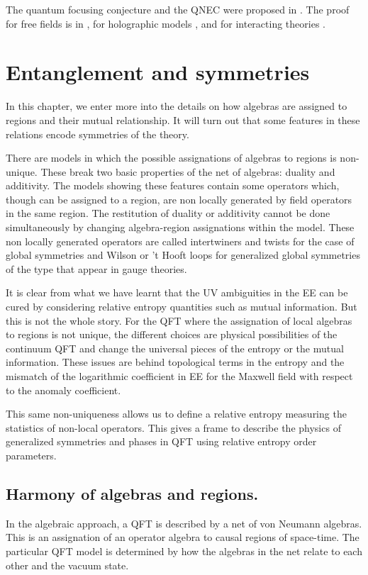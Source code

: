 \documentclass[11pt]{article}
\numberwithin{equation}{section}
\begin{document}
The quantum focusing conjecture and the QNEC were proposed in \cite{Bousso:2015mna}. The proof for free fields is in \cite{Bousso:2015wca}, for holographic models  \cite{Koeller:2015qmn,Leichenauer:2018obf}, and for interacting theories \cite{Balakrishnan:2017bjg,Balakrishnan:2019gxl}. 
 
\newpage

\section{Entanglement and symmetries}
In this chapter, we enter more into the details on how algebras are assigned to regions and their mutual relationship. It will turn out that some features in these relations encode symmetries of the theory.  

There are models in which the possible assignations of algebras to regions is non-unique. These break two basic properties of the net of algebras: duality and additivity. The models showing these features contain some operators which, though can be assigned to a region, are non locally generated by field operators in the same region.  The restitution of duality or additivity cannot be done simultaneously by changing algebra-region assignations within the model. These non locally generated operators are called intertwiners and twists for the case of global symmetries and Wilson or 't Hooft loops for generalized global symmetries of the type that appear in gauge theories.

It is clear from what we have learnt that the UV ambiguities in the EE can be cured by considering relative entropy quantities such as mutual information. But this is not the whole story. For the QFT where the assignation of local algebras to regions is not unique, the different choices are physical possibilities of the continuum QFT and change the universal pieces of the entropy or the mutual information. These issues are behind topological terms in the entropy and the mismatch of the logarithmic coefficient in EE for the Maxwell field with respect to the anomaly coefficient. 

This same non-uniqueness allows us to define a relative entropy measuring the statistics of non-local operators. This gives a frame to describe the physics of generalized symmetries and phases in QFT using relative entropy order parameters. 
 

\subsection{Harmony of algebras and regions. }
In the algebraic approach, a QFT is described by a net of von Neumann algebras. This is an assignation of an operator algebra to causal regions of space-time. The particular QFT model is determined by how the algebras in the net relate to each other and the vacuum state.
\end{document}
